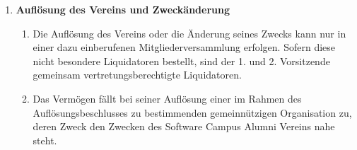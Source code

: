 \documentclass{article}
\begin{document}
\begin{enumerate}[§ 1.]
\item \textsf{\textbf{Auflösung des Vereins und Zweckänderung}}
	\begin{enumerate}[1.]
	\item Die Auflösung des Vereins oder die Änderung seines Zwecks
kann nur in einer dazu einberufenen Mitgliederversammlung erfolgen. Sofern
diese nicht besondere Liquidatoren bestellt, sind der 1. und 2. Vorsitzende
gemeinsam vertretungsberechtigte Liquidatoren. 
	\item Das Vermögen fällt bei seiner Auflösung einer im Rahmen des
Auflösungsbeschlusses zu bestimmenden gemeinnützigen Organisation zu,
deren Zweck den Zwecken des Software Campus Alumni Vereins nahe steht.
	\end{enumerate}

\end{enumerate}
\end{document}
